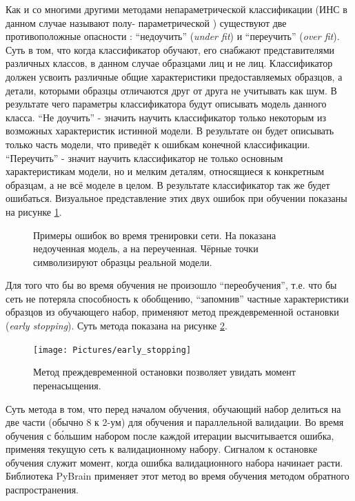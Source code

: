 \documentclass[12pt]{report}
\begin{document}
Как и со многими другими методами непараметрической классификации (ИНС в данном случае называют полу-
параметрической 
\citep{xu2006color}) существуют две противоположные опасности %
: ``недоучить'' (\textit{under fit}) и ``переучить'' (\textit{over fit}). Суть в том, что когда классификатор 
обучают, его снабжают представителями различных классов, в данном случае образцами лиц и не лиц. Классификатор 
должен 
усвоить различные общие характеристики предоставляемых образцов, а детали, которыми образцы отличаются друг от 
друга 
не учитывать как шум. В результате чего параметры классификатора будут описывать модель данного класса. ``Не
доучить'' - значить научить классификатор только некоторым из возможных характеристик истинной модели. В результате 
он будет описывать только часть модели, что приведёт к ошибкам конечной классификации. ``Переучить'' - значит 
научить 
классификатор не только основным характеристикам модели, но и мелким деталям, относящиеся к конкретным образцам, а 
не 
всё моделе в целом. В результате классификатор так же будет ошибаться. \citep{bradski2008learning} Визуальное 
представление этих двух ошибок при обучении показаны на рисунке \ref{fig:under_over_fit}.

\begin{figure}[h]
	\centering
	\caption{Примеры ошибок во время тренировки сети. На  показана недоученная модель, а на 
 переученная. Чёрные точки символизируют образцы реальной модели. \citep{bradski2008learning}}
	\label{fig:under_over_fit}
\end{figure}

Для того что бы во время обучения не произошло ``переобучения'', т.е. что бы сеть не потеряла способность к 
обобщению, ``запомнив'' частные характеристики образцов из обучающего набор, применяют метод преждевременной 
остановки (\textit{early stopping}). Суть метода показана на рисунке \ref{fig:early_stop}.

\begin{figure}[h]
	\centering
	\texttt{[image: Pictures/early\_stopping]}
	\caption{Метод преждевременной остановки позволяет увидать момент перенасыщения.}
	\label{fig:early_stop}
\end{figure}

Суть метода в том, что перед началом обучения, обучающий набор делиться на две части (обычно 8 к 2-ум) для обучения 
и 
параллельной валидации. Во время обучения с б\'{о}льшим набором после каждой итерации высчитывается ошибка, 
применяя 
текущую сеть к валидационному набору. Сигналом к остановке обучения служит момент, когда ошибка валидационного 
набора 
начинает расти. Библиотека PyBrain применяет этот метод во время обучения методом обратного распространения.
\end{document}
